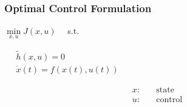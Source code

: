 
\begin{frame}
	\frametitle{Optimal Control Formulation}
	\begin{block}{}
		\begin{center}
		 \parbox{9.5cm}{\( \min \limits_{x,u} J(x,u) \quad  \) s.t. \parbox{\textwidth}{
				\( \quad \begin{array}{c} \tilde{h}(x,u)=0 \\  \dot{x}(t) = f(x(t),u(t)) \end{array}\)}}
				\begin{align*}
					x: & \quad \text{state} \\
					u: & \quad \text{control}
				\end{align*}
		\end{center}
	\end{block}
\end{frame}

